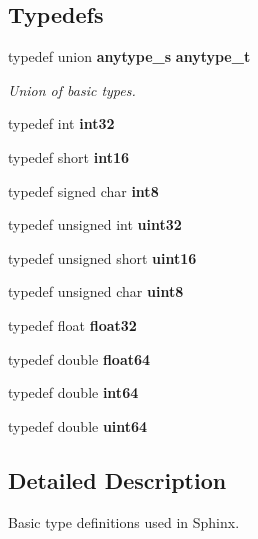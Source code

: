 \subsection*{Typedefs}
\begin{DoxyCompactItemize}
\item 
\mbox{\label{prim__type_8h_a98bfefef272895ed1506502cdb8c1aa3}} 
typedef union \textbf{ anytype\+\_\+s} \textbf{ anytype\+\_\+t}
\begin{DoxyCompactList}\small\item\em Union of basic types. \end{DoxyCompactList}\item 
\mbox{\label{prim__type_8h_a56f1a81c92849566ae864511088eb7e8}} 
typedef int {\bfseries int32}
\item 
\mbox{\label{prim__type_8h_a4355d16fcf9f644c9ac84293f0b1801f}} 
typedef short {\bfseries int16}
\item 
\mbox{\label{prim__type_8h_a1b956fe1df85f3c132b21edb4e116458}} 
typedef signed char {\bfseries int8}
\item 
\mbox{\label{prim__type_8h_a1134b580f8da4de94ca6b1de4d37975e}} 
typedef unsigned int {\bfseries uint32}
\item 
\mbox{\label{prim__type_8h_a05f6b0ae8f6a6e135b0e290c25fe0e4e}} 
typedef unsigned short {\bfseries uint16}
\item 
\mbox{\label{prim__type_8h_adde6aaee8457bee49c2a92621fe22b79}} 
typedef unsigned char {\bfseries uint8}
\item 
\mbox{\label{prim__type_8h_aacdc525d6f7bddb3ae95d5c311bd06a1}} 
typedef float {\bfseries float32}
\item 
\mbox{\label{prim__type_8h_a232fad1b0d6dcc7c16aabde98b2e2a80}} 
typedef double {\bfseries float64}
\item 
\mbox{\label{prim__type_8h_a5ca2adc31be9c44adfeb373feb166821}} 
typedef double {\bfseries int64}
\item 
\mbox{\label{prim__type_8h_a521337cd39452f9e318a6a3c3f6694ca}} 
typedef double {\bfseries uint64}
\end{DoxyCompactItemize}


\subsection{Detailed Description}
Basic type definitions used in Sphinx. 

